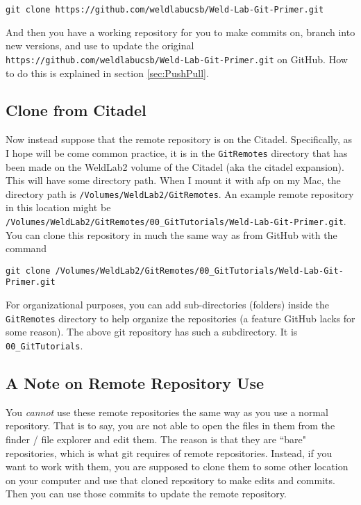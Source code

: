 \documentclass[11pt]{article}
\newcommand{\code}[1]{\begin{adjustwidth}{0.5in}{0in}
    \texttt{#1}
    \end{adjustwidth}}
\begin{document}
\code{git clone https://github.com/weldlabucsb/Weld-Lab-Git-Primer.git}

And then you have a working repository for you to make commits on, branch into new versions, and use to update the original \texttt{https://github.com/weldlabucsb/Weld-Lab-Git-Primer.git} on GitHub.  How to do this is explained in section \ref{sec:PushPull}.

\subsection{Clone from Citadel}
Now instead suppose that the remote repository is on the Citadel.  Specifically, as I hope will be come common practice, it is in the \texttt{GitRemotes} directory that has been made on the WeldLab2 volume of the Citadel (aka the citadel expansion).  This will have some directory path.  When I mount it with afp on my Mac, the directory path is \texttt{/Volumes/WeldLab2/GitRemotes}.  An example remote repository in this location might be\\ 
\texttt{/Volumes/WeldLab2/GitRemotes/00\_GitTutorials/Weld-Lab-Git-Primer.git}.  You can clone this repository in much the same way as from GitHub with the command

\begin{center}
\texttt{git clone /Volumes/WeldLab2/GitRemotes/00\_GitTutorials/Weld-Lab-Git-Primer.git}
\end{center}

For organizational purposes, you can add sub-directories (folders) inside the \texttt{GitRemotes} directory to help organize the repositories (a feature GitHub lacks for some reason).  The above git repository has such a subdirectory.  It is \texttt{00\_GitTutorials}.

\subsection{A Note on Remote Repository Use}
You \emph{cannot} use these remote repositories the same way as you use a normal repository.  That is to say, you are not able to open the files in them from the finder / file explorer and edit them.  The reason is that they are ``bare" repositories, which is what git requires of remote repositories.  Instead, if you want to work with them, you are supposed to clone them to some other location on your computer and use that cloned repository to make edits and commits.  Then you can use those commits to update the remote repository.  
\end{document}
